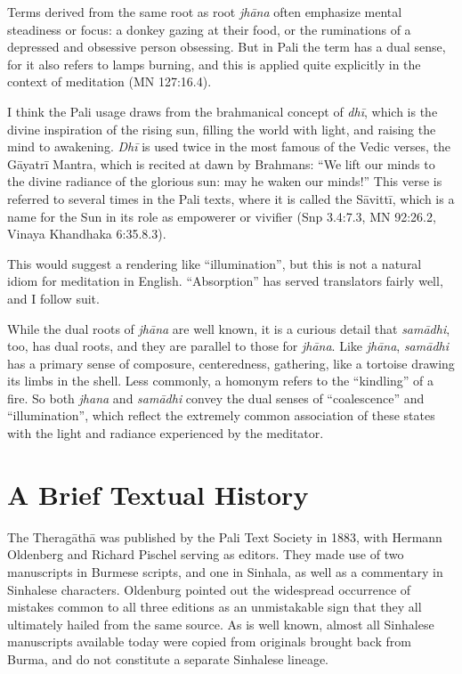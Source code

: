 \documentclass[12pt,openany]{book}%
\begin{document}
Terms derived from the same root as root \textit{\textsanskrit{jhāna}} often emphasize mental steadiness or focus: a donkey gazing at their food, or the ruminations of a depressed and obsessive person obsessing. But in Pali the term has a dual sense, for it also refers to lamps burning, and this is applied quite explicitly in the context of meditation (MN 127:16.4).

I think the Pali usage draws from the brahmanical concept of \textit{\textsanskrit{dhī}}, which is the divine inspiration of the rising sun, filling the world with light, and raising the mind to awakening. \textit{\textsanskrit{Dhī}} is used twice in the most famous of the Vedic verses, the \textsanskrit{Gāyatrī} Mantra,  which is recited at dawn by Brahmans: “We lift our minds to the divine radiance of the glorious sun: may he waken our minds!” This verse is referred to several times in the Pali texts, where it is called the \textsanskrit{Sāvittī}, which is a name for the Sun in its role as empowerer or vivifier (Snp 3.4:7.3, MN 92:26.2, Vinaya Khandhaka 6:35.8.3).

This would suggest a rendering like “illumination”, but this is not a natural idiom for meditation in English. “Absorption” has served translators fairly well, and I follow suit.

While the dual roots of \textit{\textsanskrit{jhāna}} are well known, it is a curious detail that \textit{\textsanskrit{samādhi}}, too, has dual roots, and they are parallel to those for \textit{\textsanskrit{jhāna}}. Like \textit{\textsanskrit{jhāna}}, \textit{\textsanskrit{samādhi}} has a primary sense of composure, centeredness, gathering, like a tortoise drawing its limbs in the shell. Less commonly, a homonym refers to the “kindling” of a fire. So both \textit{jhana} and \textit{\textsanskrit{samādhi}} convey the dual senses of “coalescence” and “illumination”, which reflect the extremely common association of these states with the light and radiance experienced by the meditator.

\section*{A Brief Textual History}

The \textsanskrit{Theragāthā} was published by the Pali Text Society in 1883, with Hermann Oldenberg and Richard Pischel serving as editors. They made use of two manuscripts in Burmese scripts, and one in Sinhala, as well as a commentary in Sinhalese characters. Oldenburg pointed out the widespread occurrence of mistakes common to all three editions as an unmistakable sign that they all ultimately hailed from the same source. As is well known, almost all Sinhalese manuscripts available today were copied from originals brought back from Burma, and do not constitute a separate Sinhalese lineage.
\end{document}
